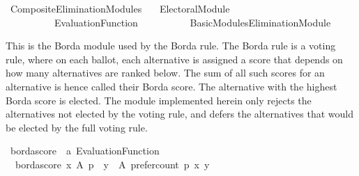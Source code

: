 %
\begin{isabellebody}%
%
%
\isadelimtheory
%
\endisadelimtheory
%
\isatagtheory
{}\isamarkupfalse%
\ Composite{\isacharunderscore}{\kern0pt}Elimination{\isacharunderscore}{\kern0pt}Modules\isanewline
\ \ \ {\isachardoublequoteopen}{\isachardot}{\kern0pt}{\isachardot}{\kern0pt}{\isacharslash}{\kern0pt}Electoral{\isacharunderscore}{\kern0pt}Module{\isachardoublequoteclose}\isanewline
\ \ \ \ \ \ \ \ \ \ {\isachardoublequoteopen}{\isachardot}{\kern0pt}{\isachardot}{\kern0pt}{\isacharslash}{\kern0pt}Evaluation{\isacharunderscore}{\kern0pt}Function{\isachardoublequoteclose}\isanewline
\ \ \ \ \ \ \ \ \ \ {\isachardoublequoteopen}{\isachardot}{\kern0pt}{\isachardot}{\kern0pt}{\isacharslash}{\kern0pt}Basic{\isacharunderscore}{\kern0pt}Modules{\isacharslash}{\kern0pt}Elimination{\isacharunderscore}{\kern0pt}Module{\isachardoublequoteclose}\isanewline
\isanewline
{}%
\endisatagtheory
{\isafoldtheory}%
%
\isadelimtheory
%
\endisadelimtheory
%
\isadelimdocument
%
\endisadelimdocument
%
\isatagdocument
%
\isamarkuptrue%
%
\endisatagdocument
{\isafolddocument}%
%
\isadelimdocument
%
\endisadelimdocument
%
\begin{isamarkuptext}%
This is the Borda module used by the Borda rule. The Borda rule is a voting
rule, where on each ballot, each alternative is assigned a score that depends
on how many alternatives are ranked below. The sum of all such scores for an
alternative is hence called their Borda score. The alternative with the highest
Borda score is elected. The module implemented herein only rejects the
alternatives not elected by the voting rule, and defers the alternatives that
would be elected by the full voting rule.%
\end{isamarkuptext}\isamarkuptrue%
%
\isadelimdocument
%
\endisadelimdocument
%
\isatagdocument
%
\isamarkuptrue%
%
\endisatagdocument
{\isafolddocument}%
%
\isadelimdocument
%
\endisadelimdocument
{}\isamarkupfalse%
\ borda{\isacharunderscore}{\kern0pt}score\ {\isacharcolon}{\kern0pt}{\isacharcolon}{\kern0pt}\ {\isachardoublequoteopen}{\isacharprime}{\kern0pt}a\ Evaluation{\isacharunderscore}{\kern0pt}Function{\isachardoublequoteclose}\ \isanewline
\ \ {\isachardoublequoteopen}borda{\isacharunderscore}{\kern0pt}score\ x\ A\ p\ {\isacharequal}{\kern0pt}\ {\isacharparenleft}{\kern0pt}{\isasymSum}y\ {\isasymin}\ A{\isachardot}{\kern0pt}\ {\isacharparenleft}{\kern0pt}prefer{\isacharunderscore}{\kern0pt}count\ p\ x\ y{\isacharparenright}{\kern0pt}{\isacharparenright}{\kern0pt}{\isachardoublequoteclose}\isanewline

\end{isabellebody}
